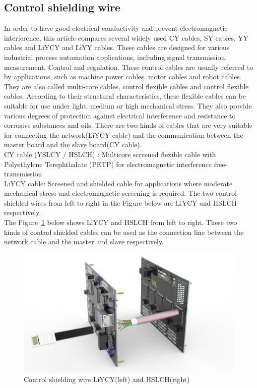 \subsection{Control shielding wire}
\label{sec:Control shielding wire}
In order to have good electrical conductivity and prevent electromagnetic interference, this article compares several widely used CY cables, SY cables, YY cables and LiYCY and LiYY cables. These cables are designed for various industrial process automation applications, including signal transmission, measurement, Control and regulation. These control cables are usually referred to by applications, such as machine power cables, motor cables and robot cables. They are also called multi-core cables, control flexible cables and control flexible cables.
According to their structural characteristics, these flexible cables can be suitable for use under light, medium or high mechanical stress. They also provide various degrees of protection against electrical interference and resistance to corrosive substances and oils.
There are two kinds of cables that are very suitable for connecting the network(LiYCY cable) and the communication between the master board and the slave board(CY cable).
\\
CY cable (YSLCY / HSLCH) : Multicore screened flexible cable with Polyethylene Terephthalate (PETP) for electromagnetic interference free-transmission
\\
LiYCY cable: Screened and shielded cable for applications where moderate mechanical stress and electromagnetic screening is required.
The two control shielded wires from left to right in the Figure below are LiYCY and HSLCH respectively.
\\
The Figure~\ref{fig:5.4} below shows LiYCY and HSLCH from left to right. These two kinds of control shielded cables can be used as the connection line between the network cable and the master and slave respectively.
\begin{figure}[!ht]
	\centering
	\includegraphics[width=16cm]{grafiken/5.4.pdf}
	\caption{Control shielding wire LiYCY(left) and HSLCH(right)} 
	\label{fig:5.4}
\end{figure}
\FloatBarrier
\\

